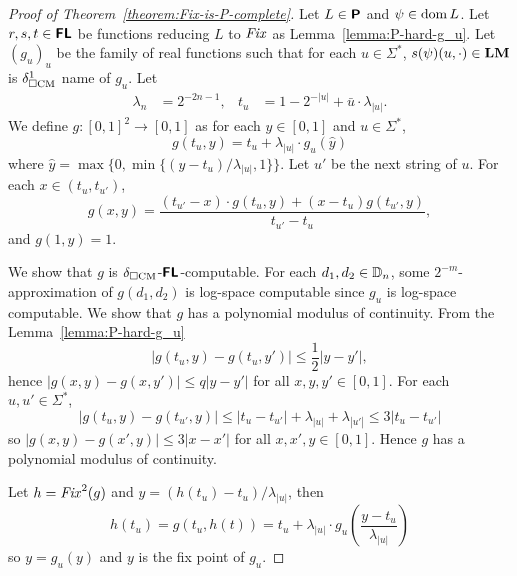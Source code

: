 \documentclass[envcountsame,orivec,oribibl]{llncs}
\begin{document}
\begin{proof}
[Proof of Theorem~\ref{theorem:Fix-is-P-complete}]
Let $L \in \text{\bfseries \sffamily \upshape P}$ and $\psi \in \mathop{\rm dom} L$.
Let $r, s, t \in \text{\bfseries \sffamily \upshape FL}$ be functions reducing $L$ to $\mathit{Fix}$
as Lemma~\ref{lemma:P-hard-g_u}.
Let $(g_u)_u$ be the family of real functions such that for each $u \in \Sigma^*$, 
$s(\psi)(u, \cdot) \in \mathbf{LM}$ is $\delta _{\square \mathrm{CM}}^1$ name of $g_u$.
Let
\begin{align}
 \lambda_n &= 2^{-2n-1},
 &
 t_u & = 1 - 2^{-|u|} + \bar u \cdot \lambda_{|u|}.
\end{align}
We define $g \colon [0,1]^2 \to [0,1]$ as
for each $y \in [0,1]$ and $u \in \Sigma^*$,
\begin{equation}
 g(t_u, y) = t_u + \lambda_{|u|} \cdot g_u(\hat y)
\end{equation}
where $\hat y = \max\{0, \min\{(y-t_u)/\lambda_{|u|}, 1\}\}$.
Let $u'$ be the next string of $u$.
For each $x \in (t_u, t_{u'})$,
\begin{equation}
 g(x, y) 
  = \frac{(t_{u'} - x) \cdot g(t_u, y) + (x - t_u)g(t_{u'}, y)}{t_{u'} - t_u},
\end{equation}
and $g(1, y) = 1$.

We show that $g$ is $\delta _{\square \mathrm{CM}}$-$\text{\bfseries \sffamily \upshape FL}$-computable.
For each $d_1, d_2 \in \mathbb D_n$, some $2^{-m}$-approximation of $g(d_1, d_2)$ 
is log-space computable since $g_u$ is log-space computable.
We show that $g$ has a polynomial modulus of continuity.
From the Lemma~\ref{lemma:P-hard-g_u}
\begin{equation}
 |g(t_u, y) - g(t_u, y')| \le \frac 1 2 |y - y'|,
\end{equation}
hence $|g(x, y) - g(x, y')| \le q|y - y'|$ for all $x, y, y' \in [0,1]$.
For each $u, u' \in \Sigma^*$,
\begin{equation}
 |g(t_u, y) - g(t_{u'}, y)| \le |t_u - t_{u'}| + \lambda_{|u|} + \lambda_{|u'|} \le 3|t_u - t_{u'}|
\end{equation}
so $|g(x, y) - g(x', y)| \le 3|x-x'|$ for all $x, x', y \in [0,1]$.
Hence $g$ has a polynomial modulus of continuity.


Let $h = \mathit{Fix}^2(g)$ and $y = (h(t_u)-t_u)/\lambda_{|u|}$, then
\begin{equation}
 h(t_u) = g(t_u, h(t)) = t_u + \lambda_{|u|} \cdot g_u \left( \frac{y-t_u}{\lambda_{|u|}} \right)
\end{equation}
so $y = g_u(y)$ and $y$ is the fix point of $g_u$.
\end{proof}
\end{document}
